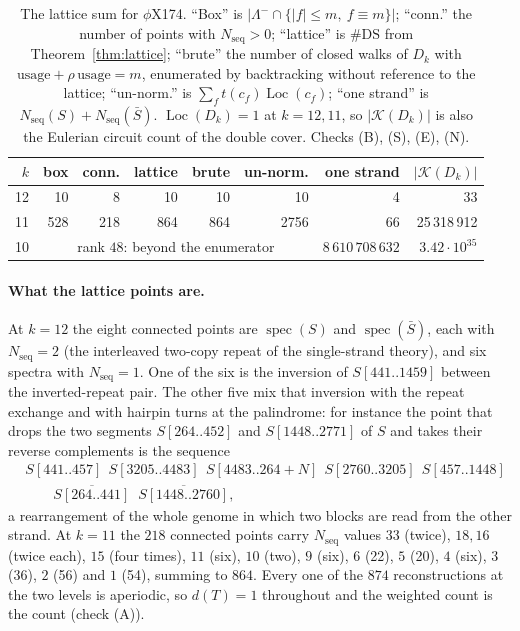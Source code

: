\documentclass[11pt]{article}
\theoremstyle{plain}
\theoremstyle{definition}
\theoremstyle{remark}
\newcommand{\K}{\mathcal{K}}
\newcommand{\spec}{\operatorname{spec}}
\newcommand{\Loc}{\operatorname{Loc}}
\newcommand{\Nseq}{N_{\mathrm{seq}}}
\newcommand{\DS}{\mathrm{DS}}
\newcommand{\Lm}{\Lambda^{-}}
\begin{document}
\begin{table}[t]
\centering
\small
\begin{tabular}{rrrrrrrr}
\toprule
$k$ & box & conn. & lattice & brute & un-norm. & one strand & $|\K(D_k)|$\\
\midrule
12 &  10 &   8 &  10 &  10 &   10 &  4 & 33\\
11 & 528 & 218 & 864 & 864 & 2756 & 66 & 25\,318\,912\\
10 & \multicolumn{5}{c}{rank $48$: beyond the enumerator} & $8\,610\,708\,632$ & $3.42\cdot10^{35}$\\
\bottomrule
\end{tabular}
\caption{The lattice sum for $\phi$X174. ``Box'' is $|\Lm\cap\{|f|\le m,\ f\equiv m\}|$;
``conn.'' the number of points with $\Nseq>0$; ``lattice'' is $\#\DS$ from
Theorem~\ref{thm:lattice}; ``brute'' the number of closed walks of $D_k$ with
$\mathrm{usage}+\rho\,\mathrm{usage}=m$, enumerated by backtracking without reference to the
lattice; ``un-norm.'' is $\sum_f t(c_f)\Loc(c_f)$; ``one strand'' is
$\Nseq(S)+\Nseq(\bar S)$. $\Loc(D_k)=1$ at $k=12,11$, so $|\K(D_k)|$ is also the Eulerian
circuit count of the double cover. Checks (B), (S), (E), (N).}
\label{tab:lattice}
\end{table}

\paragraph{What the lattice points are.}
At $k=12$ the eight connected points are $\spec(S)$ and $\spec(\bar S)$, each with
$\Nseq=2$ (the interleaved two-copy repeat of the single-strand theory), and six spectra with
$\Nseq=1$. One of the six is the inversion of $S[441..1459]$ between the inverted-repeat pair.
The other five mix that inversion with the repeat exchange and with hairpin turns at the
palindrome: for instance the point that drops the two segments $S[264..452]$ and
$S[1448..2771]$ of $S$ and takes their reverse complements is the sequence
\begin{align*}
  &S[441..457]\;\,S[3205..4483]\;\,S[4483..264{+}N]\;\,S[2760..3205]\;\,S[457..1448]\\
  &\qquad\overline{S[264..441]}\;\;\overline{S[1448..2760]},
\end{align*}
a rearrangement of the whole genome in which two blocks are read from the other strand. At
$k=11$ the $218$ connected points carry $\Nseq$ values $33$ (twice), $18,16$ (twice each),
$15$ (four times), $11$ (six), $10$ (two), $9$ (six), $6$ (22), $5$ (20), $4$ (six), $3$ (36),
$2$ (56) and $1$ (54), summing to $864$. Every one of the $874$ reconstructions at the two
levels is aperiodic, so $d(T)=1$ throughout and the weighted count is the count (check (A)).
\end{document}
